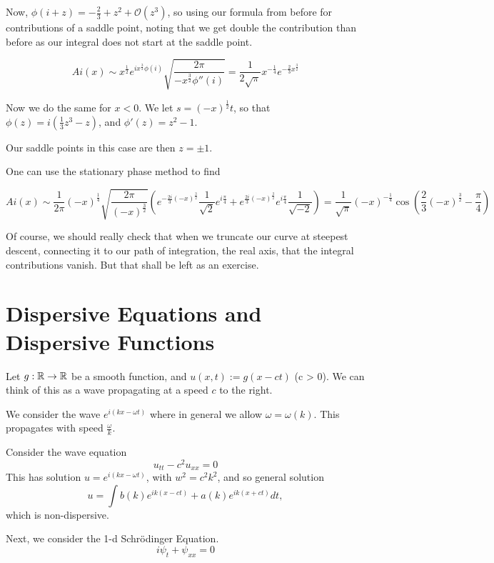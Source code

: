 \documentclass[a4paper]{article}
\begin{document}
Now, $\phi(i+z) = -\frac{2}{3} + z^2 + \mathcal{O}\left( z^3 \right) $, so using our formula from before for contributions of a saddle point, noting that we get double the contribution than before as our integral does not start at the saddle point.

\[
	Ai(x) \sim x^{\frac{1}{2}} e^{ix^{\frac{3}{2}}\phi(i)} \sqrt{\frac{2\pi}{-x^{\frac{3}{2}}\phi''(i) }} =  \frac{1}{2\sqrt{\pi} } x^{-\frac{1}{4}} e^{-\frac{2}{3} x^{\frac{3}{2}}}
\] 

Now we do the same for $x<0$. We let $s = (-x)^{\frac{1}{2}} t$, so that $\phi(z) = i\left( \frac{1}{3} z^3 - z \right) $, and $\phi'(z) = z^2 - 1$.

Our saddle points in this case are then $z = \pm 1$.

One can use the stationary phase method to find

 \[
	 Ai(x) \sim \frac{1}{2\pi} (-x)^{\frac{1}{4}} \sqrt{\frac{2\pi}{(-x)^{\frac{3}{2}}}} \left( e^{-\frac{2i}{3} (-x)^{\frac{3}{2}}} \frac{1}{\sqrt{2} } e^{i\frac{\pi}{4}} + e^{\frac{2i}{3} (-x)^{\frac{3}{2}}} e^{i\frac{\pi}{4}} \frac{1}{\sqrt{-2} } \right) = \frac{1}{\sqrt{\pi} }(-x)^{-\frac{1}{4}} \cos\left( \frac{2}{3} (-x)^{\frac{3}{2}} - \frac{\pi}{4} \right) 
\] 

Of course, we should really check that when we truncate our curve at steepest descent, connecting it to our path of integration, the real axis, that the integral contributions vanish. But that shall be left as an exercise.


\section{Dispersive Equations and Dispersive Functions}

Let $g: \mathbb{R} \to \mathbb{R}$ be a smooth function, and $u(x,t) := g(x-ct)$ (c > 0). We can think of this as a wave propagating at a speed  $c$ to the right.

We consider the wave $e^{i(kx - \omega t)}$ where in general we allow $\omega = \omega(k)$. This propagates with speed $\frac{\omega}{k}$.

Consider the wave equation
\[
u_{t t} - c^2 u_{x x} = 0
\]
This has solution $u = e^{i(kx - \omega t)}$, with $w^2 = c^2 k ^2$, and so general solution
\[
	u = \int b(k) e^{ik(x - ct)} + a(k) e^{ik(x+ct)} dt
,\] which is non-dispersive.

\vspace{1em}

Next, we consider the 1-d Schr\"{o}dinger Equation. 
\[
i\psi_t + \psi_{x x} = 0
\]
\end{document}
